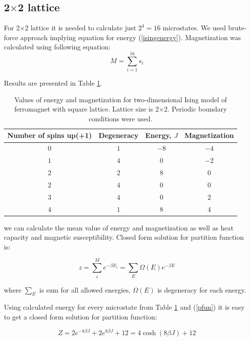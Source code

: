 \documentclass[10pt]{article}
\begin{document}
\subsection{2$\times$2 lattice}

For 2$\times$2 lattice it is needed to calculate just $2^4 = 16$ microstates. We used brute-force approach implying equation for energy (\ref{isingenergy}). Magnetization was calculated using following equation:
\[
M=\sum_{i=1}^{16} s_i
\]

Results are presented in Table \ref{tab:2x2}.

\begin{table}[h!]
  \caption{Values of energy and magnetization for two-dimensional Ising model of ferromagnet with square lattice. Lattice size is 2$\times$2. Periodic boundary conditions were used.}
  \label{tab:2x2}
  \begin{center}
    \begin{tabular}{c|c|c|c}
    \hline
		Number of spins up(+1) & Degeneracy & Energy, $J$ & Magnetization \\
        \hline
	$	0 $  & $ 1 $ & $ -8 $ & $ -4 $  \\
	$	1 $  & $ 4 $ & $  0 $ & $ -2 $  \\
	$	2 $  & $ 2 $ & $  8 $ & $ 0  $  \\
	$	2 $  & $ 4 $ & $  0 $ & $ 0  $  \\
	$	3 $  & $ 4 $ & $  0 $ & $ 2  $  \\
  $	4 $  & $ 1 $ & $  8 $ & $ 4  $  \\

	\end{tabular}
  \end{center}
\end{table}

 we can calculate the mean value of energy and
magnetization as well as heat capacity and magnetic susceptibility.
Closed form solution for partition function is:

\begin{equation}\label{pfun}
z=\sum_{i}^{M}e^{-\beta E_{i}}=\sum_{E}\Omega (E)e^{-\beta E}
\end{equation}

where $\sum_{E}$ is sum for all allowed energies, $\Omega (E)$ is degeneracy
for each energy. 

Using calculated energy for every microstate from Table \ref{tab:2x2} and (\ref{pfun}) it is easy to get a closed form solution for
partition function:

\begin{equation}
Z=2e^{-8\beta J}+2e^{8\beta J}+12=4\cosh (8\beta J)+12
\end{equation}
\end{document}
